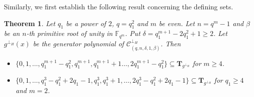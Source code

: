 \documentclass[journal,12pt,onecolumn]{IEEEtran}
\newtheorem{theorem}{Theorem}
\begin{document}
Similarly, we first establish the following result concerning the defining sets.

\begin{theorem}
    \label{Hermitian low delta}
    Let $q_1$ be a power of $2$, $q=q_1^2$ and $m$ be even. Let $n=q^m-1$ and $\beta$ be an $n$-th primitive root of unity in $\mathbb{F}_{q^m}$. Put $\delta=q_1^{m+1}-2q_1^2+1\ge 2$. Let $g^{\perp_H}(x)$ be the generator polynomial of $\mathcal{C}_{(q,n,\delta,1,\beta)}^{\perp_H}$. Then
    \begin{itemize}
        \item $\{0,1,\dots,q_1^{m+1}-q_1^2,q_1^{m+1},q_1^{m+1}+1\dots,2q_1^{m+1}-q_1^2\}\subseteq\textbf{T}_{g^{\perp_H}}$ for $m\ge 4$.
        \item $\{0,1,\dots,q_1^3-q_1^2+2q_1-1,q_1^3,q_1^3+1,\dots,2q_1^3-q_1^2+2q_1-1\}\subseteq\textbf{T}_{g^{\perp_H}}$ for $q_1\ge4$ and $m=2$.
    \end{itemize}
\end{theorem}
\end{document}
